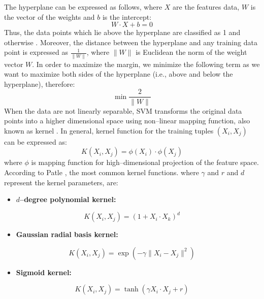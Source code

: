 The hyperplane can be expressed as follows, where $X$ are the features data, $W$ is the vector of the weights and $b$ is the intercept:
\begin{equation}\label{eq:wxdo0}
    W \cdot X + b = 0
\end{equation}
Thus, the data points which lie above the hyperplane are classified as 1 and otherwise \citep{hsu2002comparison}.
Moreover, the distance between the hyperplane and any training data point is expressed as $\frac{1}{\|W\|}$, where $\|W\|$ is Euclidean the norm of the weight vector $W$.
In order to maximize the margin, we minimize the following term as we want to maximize both sides of the hyperplane (i.e., above and below the hyperplane), therefore:
\begin{equation}
    \min {\frac{2}{\|W\|}}
\end{equation}
When the data are not linearly separable, SVM transforms the original data points into a higher dimensional space using non--linear mapping function, also known as kernel \citep{han2011data}.
In general, kernel function for the training tuples $(X_i,X_j)$ can be expressed as:
\begin{equation}
    K(X_i,X_j) = \phi(X_i) \cdot \phi(X_j)
\end{equation}
where $\phi$ is mapping function for high--dimensional projection of the feature space. According to Patle \citep{patle2013svm}, the most common kernel functions. where $\gamma$ and $r$ and $d$ represent the kernel parameters, are:
\begin{itemize}\setlength\itemsep{0em}
    \item \textbf{ $d$--degree polynomial kernel:}
\end{itemize}
\begin{equation}
    K\left(X_i,X_j\right) = (1+X_i \cdot X_k)^{d}
\end{equation}
\begin{itemize}\setlength\itemsep{0em}
    \item \textbf{Gaussian radial basis kernel:}
\end{itemize}
\begin{equation}
    K(X_i,X_j) = \exp\left(-\gamma \|X_i-X_j\|^{2}\right)
\end{equation}
\begin{itemize}\setlength\itemsep{0em}
    \item \textbf{Sigmoid kernel:}
\end{itemize}
\begin{equation}
    K(X_i,X_j) = \tanh(\gamma X_i \cdot X_j + r)
\end{equation}
